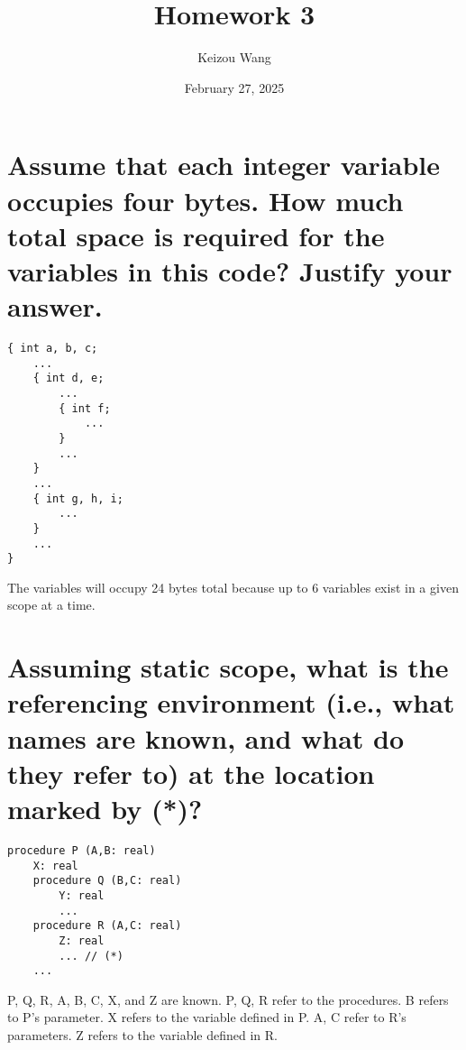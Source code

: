 \documentclass[letterpaper]{article}
\title{Homework 3}
\author{Keizou Wang}
\date{February 27, 2025}
\begin{document}
\maketitle

\section{Assume that each integer variable occupies four bytes. How much total space is required for
the variables in this code? Justify your answer.}
\begin{adjustwidth}{2.35em}{0pt}
\begin{lstlisting}
{ int a, b, c;
	...
	{ int d, e;
		...
		{ int f;
			...
		}
		...
	}
	...
	{ int g, h, i;
		...
	}
	...
}
\end{lstlisting}
The variables will occupy 24 bytes total because up to 6 variables exist in a given scope at a time.
\end{adjustwidth}

\section{Assuming static scope, what is the referencing environment (i.e., what names are known, and
what do they refer to) at the location marked by (*)?}
\begin{adjustwidth}{2.35em}{0pt}
\begin{Verbatim}[tabsize=4]
procedure P (A,B: real)
	X: real
	procedure Q (B,C: real)
		Y: real
		...
	procedure R (A,C: real)
		Z: real
		... // (*)
	...
\end{Verbatim}
P, Q, R, A, B, C, X, and Z are known. P, Q, R refer to the procedures. B refers to P's parameter. X refers to the variable defined in P. A, C refer to R's parameters. Z refers to the variable defined in R.
\end{adjustwidth}
\end{document}
